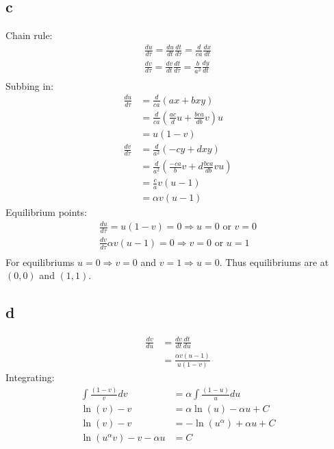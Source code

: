 \documentclass{unswmaths}
\begin{document}
\subsection*{c}
    Chain rule:
    \begin{align*}
        \frac{du}{d\tau} = \frac{du}{dt} \frac{dt}{d\tau} = \frac{d}{ca}\frac{dx}{dt} \\
        \frac{dv}{d\tau} = \frac{dv}{dt} \frac{dt}{d\tau} = \frac{b}{a^2} \frac{dy}{dt} \\
    \end{align*}
    Subbing in:
    \begin{align*}
        \frac{du}{d\tau} &= \frac{d}{ca} \left( ax + bxy \right) \\
            &= \frac{d}{ca} \left( \frac{ac}{d} u + \frac{bca}{db} v\right)u \\
            &= u(1-v) \\
        \frac{dv}{d\tau} &= \frac{d}{a^2} \left( -cy + dxy \right) \\
            &= \frac{d}{a^2} \left( \frac{-ca}{b} v + d\frac{bca}{db} vu\right) \\
            &= \frac{c}{a} v\left(u - 1\right) \\
            &= \alpha v(u - 1)
    \end{align*}
    Equilibrium points:
    \begin{align*}
        \frac{du}{d\tau} = u(1-v) = 0 \Longrightarrow  u = 0 \text{ or } v = 0 \\
        \frac{dv}{d\tau} \alpha v(u-1) = 0 \Longrightarrow v = 0 \text{ or } u = 1 \\
    \end{align*}
    For equilibriums $ u = 0 \Longrightarrow v = 0 $ and $ v = 1 \Longrightarrow u = 0 $.
    Thus equilibriums are at $ (0,0) $ and $ (1,1) $.
\subsection*{d}
    \begin{align*}
        \frac{dv}{du} &= \frac{dv}{dt} \frac{dt}{du} \\
            &= \frac{\alpha v(u-1)}{u(1-v)}
    \end{align*}
    Integrating:
    \begin{align*}
        \int \frac{(1-v)}{v}dv &= \alpha \int \frac{(1-u)}{u} du \\
        \ln(v) - v &= \alpha \ln(u) - \alpha u + C \\
        \ln(v) - v &= -\ln(u^\alpha) + \alpha u  + C \\
        \ln(u^\alpha v) - v -\alpha u &= C
    \end{align*}
\end{document}
